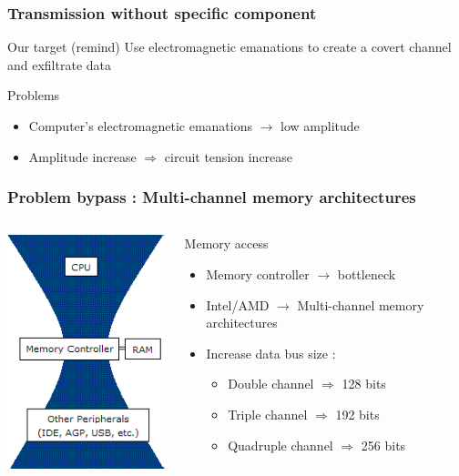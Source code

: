 \begin{frame}
\frametitle{Transmission without specific component}
\begin{block}{Our target (remind)}
Use electromagnetic emanations to create a covert channel and exfiltrate data
\end{block}
\begin{alertblock}{Problems}
\begin{itemize}
\item Computer's electromagnetic emanations $\rightarrow$ low amplitude
\item Amplitude increase $\Rightarrow$ circuit tension increase
\end{itemize}
\end{alertblock}
\end{frame}

\begin{frame}
\frametitle{Problem bypass : Multi-channel memory architectures}

\begin{columns}[c] %
\begin{column}{.28\textwidth}
\centering \includegraphics[scale=.3]{images/goulot.png}
\end{column}%
\hfill%
\begin{column}{.68\textwidth}
\begin{block}{Memory access}
\begin{itemize}
\item Memory controller $\rightarrow$ bottleneck
\item Intel/AMD $\rightarrow$ Multi-channel memory architectures
\item Increase data bus size :
\begin{itemize}
\item Double channel $\Rightarrow$ 128 bits
\item Triple channel $\Rightarrow$ 192 bits
\item Quadruple channel $\Rightarrow$ 256 bits
\end{itemize}
\end{itemize}
\end{block}
\end{column}%
\end{columns}

\end{frame}

